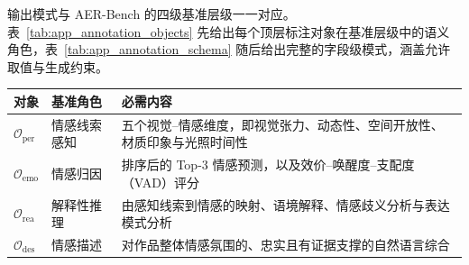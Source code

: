 输出模式与 AER-Bench 的四级基准层级一一对应。表~\ref{tab:app_annotation_objects} 先给出每个顶层标注对象在基准层级中的语义角色，表~\ref{tab:app_annotation_schema} 随后给出完整的字段级模式，涵盖允许取值与生成约束。

\begin{table}[!htbp]
    \centering
    \vspace{0.4em}\wuhao
    \setlength{\tabcolsep}{5pt}
    \renewcommand{\arraystretch}{1.15}
    \begin{tabularx}{\textwidth}{@{}p{}p{}X@{}}
    \toprule
    对象 & 基准角色 & 必需内容 \\
    \midrule
    $\mathcal{O}_{\text{per}}$ & 情感线索感知 & 五个视觉--情感维度，即视觉张力、动态性、空间开放性、材质印象与光照时间性 \\
    $\mathcal{O}_{\text{emo}}$ & 情感归因 & 排序后的 Top-3 情感预测，以及效价--唤醒度--支配度（VAD）评分 \\
    $\mathcal{O}_{\text{rea}}$ & 解释性推理 & 由感知线索到情感的映射、语境解释、情感歧义分析与表达模式分析 \\
    $\mathcal{O}_{\text{des}}$ & 情感描述 & 对作品整体情感氛围的、忠实且有证据支撑的自然语言综合 \\
    \bottomrule
    \end{tabularx}
\end{table}

